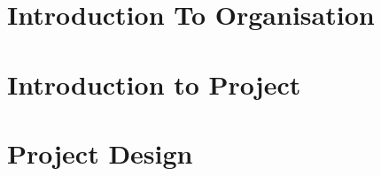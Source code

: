 \documentclass[12pt]{report}
\begin{document}

\begin{screen}
\ppttitle
\end{screen}
\footskip 0.7cm
\thispagestyle{empty} 
\pagetitle
\newpage
{}
\cfoot{\thepage}


\newpage



\newpage
\tableofcontents
\newpage
\listoffigures
\newpage

\cfoot{\thepage}

%
%

%
%
%
\newpage
\chapter*{Introduction To Organisation}

\newpage
\chapter{Introduction to Project}

%
%
%
\chapter{Project Design}



%
\end{document}
